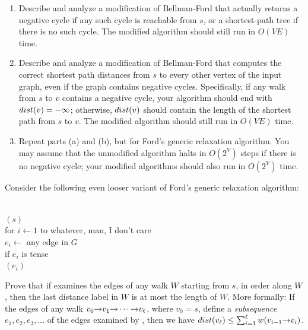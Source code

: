 \begin{exercises}
\item
\begin{enumerate}
\item Describe and analyze a modification of Bellman-Ford that actually returns a negative cycle if any such cycle is reachable from $s$, or a shortest-path tree if there is no such cycle.
The modified algorithm should still run in $O(VE)$ time.
\item Describe and analyze a modification of Bellman-Ford that computes the correct shortest path distances from $s$ to every other vertex of the input graph, even if the graph contains negative cycles.
Specifically, if any walk from $s$ to $v$ contains a negative cycle, your algorithm should end with $dist(v) = -\infty$; otherwise, $dist(v)$ should contain the length of the shortest path from $s$ to $v$.
The modified algorithm should still run in $O(VE)$ time.
\item {} Repeat parts (a) and (b), but for Ford’s generic relaxation algorithm.
You may assume that the unmodified algorithm halts in $O(2^V)$ steps if there is no negative cycle; your modified algorithms should also run in $O(2^V)$ time.
\end{enumerate}

\item Consider the following even looser variant of Ford’s generic relaxation algorithm:
\begin{pseudocode}
\\
$(s)$\\
for $i \gets 1$ to whatever, man, I don’t care\\
\Indent $e_i \gets$ any edge in $G$\\
\Indent if $e_i$ is tense\\
\Indent\Indent {}$(e_i)$
\end{pseudocode}
Prove that if  examines the edges of any walk $W$ starting from $s$, in order along $W$, then the last distance label in $W$ is at most the length of $W$.
More formally: If the edges of any walk $v_0\mathord{\rightarrow}v_1\mathord{\rightarrow}\cdots\mathord{\rightarrow}v_\ell$, where $v_0 = s$, define a \textit{subsequence} $e_1, e_2, e_3, \dots$ of the edges examined by , then we have $dist(v_\ell) \le \sum_{i=1}^{\ell} w(v_{i-1}\mathord{\rightarrow}v_i)$.


\end{exercises}
